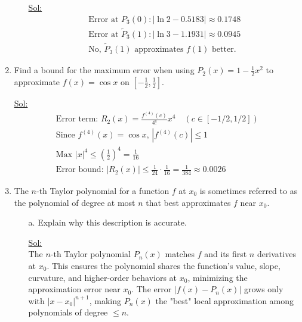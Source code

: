 \begin{enumerate}
\begin{itemize}
      \underline{Sol:}\\
      \[
        \begin{array}{l}
          \textrm{Error at } P_3(0): |\ln 2 - 0.5183| \approx 0.1748 \\
          \textrm{Error at } \tilde{P}_3(1): |\ln 3 - 1.1931| \approx 0.0945 \\
          \textrm{No, } \tilde{P}_3(1) \textrm{ approximates } f(1)
          \textrm{ better.}
        \end{array}
      \]
      \bigbreak
  \end{itemize}

\item Find a bound for the maximum error when using \( P_2(x) = 1 -
  \frac{1}{2}x^2 \) to approximate \( f(x) = \cos x \) on
  \(\left[-\frac{1}{2}, \frac{1}{2}\right]\).

  \underline{Sol:}\\
  \[
    \begin{array}{l}
      \textrm{Error term: } R_2(x) = \frac{f^{(4)}(c)}{4!}x^4 \quad
      (c \in [-1/2, 1/2]) \\
      \textrm{Since } f^{(4)}(x) = \cos x \textrm{, } |f^{(4)}(c)| \leq 1 \\
      \textrm{Max } |x|^4 \leq \left(\frac{1}{2}\right)^4 = \frac{1}{16} \\
      \textrm{Error bound: } |R_2(x)| \leq \frac{1}{24} \cdot
      \frac{1}{16} = \frac{1}{384} \approx 0.0026
    \end{array}
  \]
  \bigbreak
\item The \( n \)-th Taylor polynomial for a function \( f \) at \(
  x_0 \) is sometimes referred to as the polynomial of degree at most
  \( n \) that best approximates \( f \) near \( x_0 \).
  \begin{itemize}
    \item[a.] Explain why this description is accurate.

      \underline{Sol:}\\
      The \( n \)-th Taylor polynomial \( P_n(x) \) matches \( f \)
      and its first \( n \) derivatives at \( x_0 \). This ensures
      the polynomial shares the function’s value, slope, curvature,
      and higher-order behaviors at \( x_0 \), minimizing the
      approximation error near \( x_0 \). The error \( |f(x) -
      P_n(x)| \) grows only with \( |x - x_0|^{n+1} \), making \(
      P_n(x) \) the "best" local approximation among polynomials of
      degree \( \leq n \).
      \bigbreak


\end{itemize}
\end{enumerate}
